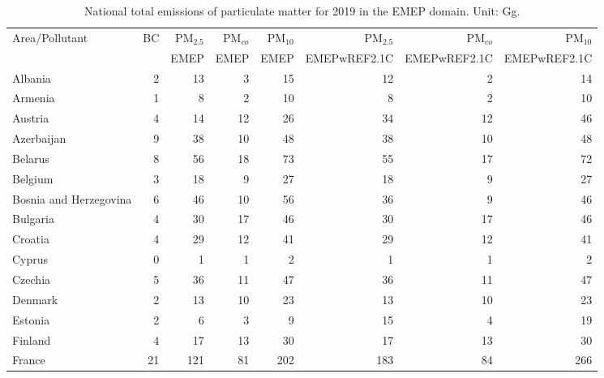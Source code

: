 \begin{table}
\caption{National total emissions of particulate matter for 2019 in the EMEP
  domain. Unit: Gg. }
\label{tab:2019emisPM}

\vspace{15pt}

\begin{center}
\scriptsize
\begin{tabular}{|l|r|r|r|r||r|r|r|}
\hline
 Area/Pollutant& BC&PM$_{2.5}$&PM$_{co}$&PM$_{10}$&PM$_{2.5}$&PM$_{co}$&PM$_{10}$\\
 &&{\tiny EMEP}&{\tiny EMEP}&{\tiny EMEP}&{\tiny EMEPwREF2.1C}&{\tiny EMEPwREF2.1C}&{\tiny EMEPwREF2.1C}\\\hline\hline
                       Albania&     2&    13&     3&    15&    12&     2&    14 \\\hline
                       Armenia&     1&     8&     2&    10&     8&     2&    10 \\\hline
                       Austria&     4&    14&    12&    26&    34&    12&    46 \\\hline
                    Azerbaijan&     9&    38&    10&    48&    38&    10&    48 \\\hline
                       Belarus&     8&    56&    18&    73&    55&    17&    72 \\\hline
                       Belgium&     3&    18&     9&    27&    18&     9&    27 \\\hline
        Bosnia and Herzegovina&     6&    46&    10&    56&    36&     9&    46 \\\hline
                      Bulgaria&     4&    30&    17&    46&    30&    17&    46 \\\hline
                       Croatia&     4&    29&    12&    41&    29&    12&    41 \\\hline
                        Cyprus&     0&     1&     1&     2&     1&     1&     2 \\\hline
                       Czechia&     5&    36&    11&    47&    36&    11&    47 \\\hline
                       Denmark&     2&    13&    10&    23&    13&    10&    23 \\\hline
                       Estonia&     2&     6&     3&     9&    15&     4&    19 \\\hline
                       Finland&     4&    17&    13&    30&    17&    13&    30 \\\hline
                        France&    21&   121&    81&   202&   183&    84&   266 \\\hline

\end{tabular}
\end{center}
\end{table}
